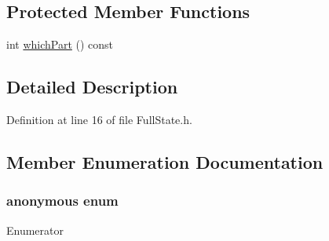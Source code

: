 \subsection*{Protected Member Functions}
\begin{DoxyCompactItemize}
\item 
int \hyperlink{classocra_1_1FullState_a489d85a3e8d2a88f31f0cac4e5f445bf}{which\+Part} () const 
\end{DoxyCompactItemize}


\subsection{Detailed Description}


Definition at line 16 of file Full\+State.\+h.



\subsection{Member Enumeration Documentation}
\subsubsection[{\texorpdfstring{anonymous enum}{anonymous enum}}]{\setlength{\rightskip}{0pt plus 5cm}anonymous enum}\hypertarget{classocra_1_1FullState_a8623fb06b8930505d950f7651e75b519}{}\label{classocra_1_1FullState_a8623fb06b8930505d950f7651e75b519}
\begin{Desc}
\item[Enumerator]\par
\begin{description}
\item[{\em 
F\+U\+L\+L\+\_\+\+S\+T\+A\+TE\hypertarget{classocra_1_1FullState_a8623fb06b8930505d950f7651e75b519af5d38d391c1a3c23006d51e6db4adea8}{}\label{classocra_1_1FullState_a8623fb06b8930505d950f7651e75b519af5d38d391c1a3c23006d51e6db4adea8}
}]\item[{\em 
F\+R\+E\+E\+\_\+\+F\+L\+Y\+ER\hypertarget{classocra_1_1FullState_a8623fb06b8930505d950f7651e75b519a2b23349d3727ddf8b0d10a6c06dfcc31}{}\label{classocra_1_1FullState_a8623fb06b8930505d950f7651e75b519a2b23349d3727ddf8b0d10a6c06dfcc31}
}]\item[{\em 
I\+N\+T\+E\+R\+N\+AL\hypertarget{classocra_1_1FullState_a8623fb06b8930505d950f7651e75b519a6c76abe0ec381b256a1e2429308126a5}{}\label{classocra_1_1FullState_a8623fb06b8930505d950f7651e75b519a6c76abe0ec381b256a1e2429308126a5}
}]\end{description}
\end{Desc}


